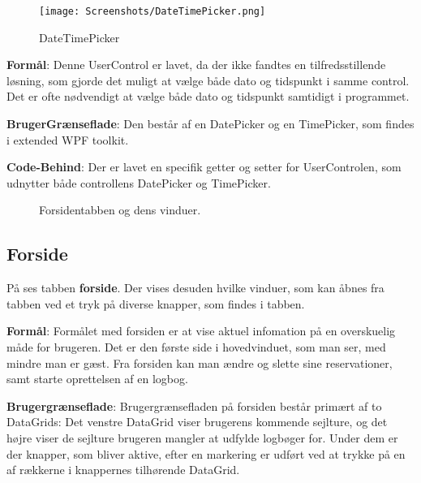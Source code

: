 \begin{wrapfigure}{r}{0.5\textwidth}
    \label{img:DateTimePicker}
    \vspace{-20pt}
    \begin{center}
        \texttt{[image: Screenshots/DateTimePicker.png]}
    \end{center}
    \vspace{-15pt}
    \caption{DateTimePicker}
    \vspace{-30pt}
\end{wrapfigure}

\textbf{Formål}: 
Denne UserControl er lavet, da der ikke fandtes en tilfredsstillende løsning, som gjorde det muligt at vælge både dato og tidspunkt i samme control. 
Det er ofte nødvendigt at vælge både dato og tidspunkt samtidigt i programmet. 

\textbf{BrugerGrænseflade}: 
Den består af en DatePicker og en TimePicker, som findes i extended WPF toolkit.

\textbf{Code-Behind}: 
Der er lavet en specifik getter og setter for UserControlen, som udnytter både controllens DatePicker og TimePicker.


\begin{center}
    \begin{figure}[h]
        \caption{Forsidentabben og dens vinduer.}
        \label{img:forside}
        \vspace{-20pt}
    \end{figure}
\end{center}

\subsection{Forside}

På  ses tabben \textbf{forside}. 
Der vises desuden hvilke vinduer, som kan åbnes fra tabben ved et tryk på diverse knapper, som findes i tabben.

\textbf{Formål}: 
Formålet med forsiden er at vise aktuel infomation på en overskuelig måde for brugeren.
Det er den første side i hovedvinduet, som man ser, med mindre man er gæst.
Fra forsiden kan man ændre og slette sine reservationer, samt starte oprettelsen af en logbog.

\textbf{Brugergrænseflade}: 
Brugergrænsefladen på forsiden består primært af to DataGrids: Det venstre DataGrid viser brugerens kommende sejlture, og det højre viser de sejlture brugeren mangler at udfylde logbøger for. 
Under dem er der knapper, som bliver aktive, efter en markering er udført ved at trykke på en af rækkerne i knappernes tilhørende DataGrid.

